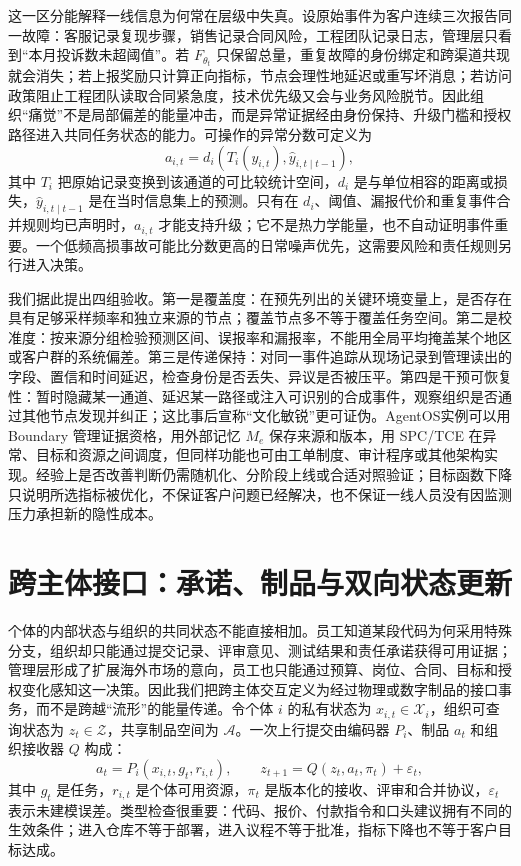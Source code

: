 这一区分能解释一线信息为何常在层级中失真。设原始事件为客户连续三次报告同一故障：客服记录复现步骤，销售记录合同风险，工程团队记录日志，管理层只看到“本月投诉数未超阈值”。若 $F_{\theta_t}$ 只保留总量，重复故障的身份绑定和跨渠道共现就会消失；若上报奖励只计算正向指标，节点会理性地延迟或重写坏消息；若访问政策阻止工程团队读取合同紧急度，技术优先级又会与业务风险脱节。因此组织“痛觉”不是局部偏差的能量冲击，而是异常证据经由身份保持、升级门槛和授权路径进入共同任务状态的能力。可操作的异常分数可定义为
\begin{equation}
 a_{i,t}=d_i\!\left(T_i(y_{i,t}),\widehat y_{i,t\mid t-1}\right),
\end{equation}
其中 $T_i$ 把原始记录变换到该通道的可比较统计空间，$d_i$ 是与单位相容的距离或损失，$\widehat y_{i,t\mid t-1}$ 是在当时信息集上的预测。只有在 $d_i$、阈值、漏报代价和重复事件合并规则均已声明时，$a_{i,t}$ 才能支持升级；它不是热力学能量，也不自动证明事件重要。一个低频高损事故可能比分数更高的日常噪声优先，这需要风险和责任规则另行进入决策。

我们据此提出四组验收。第一是覆盖度：在预先列出的关键环境变量上，是否存在具有足够采样频率和独立来源的节点；覆盖节点多不等于覆盖任务空间。第二是校准度：按来源分组检验预测区间、误报率和漏报率，不能用全局平均掩盖某个地区或客户群的系统偏差。第三是传递保持：对同一事件追踪从现场记录到管理读出的字段、置信和时间延迟，检查身份是否丢失、异议是否被压平。第四是干预可恢复性：暂时隐藏某一通道、延迟某一路径或注入可识别的合成事件，观察组织是否通过其他节点发现并纠正；这比事后宣称“文化敏锐”更可证伪。AgentOS实例可以用 Boundary 管理证据资格，用外部记忆 $M_e$ 保存来源和版本，用 SPC/TCE 在异常、目标和资源之间调度，但同样功能也可由工单制度、审计程序或其他架构实现。经验上是否改善判断仍需随机化、分阶段上线或合适对照验证；目标函数下降只说明所选指标被优化，不保证客户问题已经解决，也不保证一线人员没有因监测压力承担新的隐性成本。

\section{跨主体接口：承诺、制品与双向状态更新}
\label{sec:cross_manifold_interaction}

个体的内部状态与组织的共同状态不能直接相加。员工知道某段代码为何采用特殊分支，组织却只能通过提交记录、评审意见、测试结果和责任承诺获得可用证据；管理层形成了扩展海外市场的意向，员工也只能通过预算、岗位、合同、目标和授权变化感知这一决策。因此我们把跨主体交互定义为经过物理或数字制品的接口事务，而不是跨越“流形”的能量传递。令个体 $i$ 的私有状态为 $x_{i,t}\in\mathcal X_i$，组织可查询状态为 $z_t\in\mathcal Z$，共享制品空间为 $\mathcal A$。一次上行提交由编码器 $P_i$、制品 $a_t$ 和组织接收器 $Q$ 构成：
\begin{equation}
 a_t=P_i(x_{i,t},g_t,r_{i,t}),\qquad z_{t+1}=Q(z_t,a_t,\pi_t)+\varepsilon_t,
\end{equation}
其中 $g_t$ 是任务，$r_{i,t}$ 是个体可用资源，$\pi_t$ 是版本化的接收、评审和合并协议，$\varepsilon_t$ 表示未建模误差。类型检查很重要：代码、报价、付款指令和口头建议拥有不同的生效条件；进入仓库不等于部署，进入议程不等于批准，指标下降也不等于客户目标达成。

